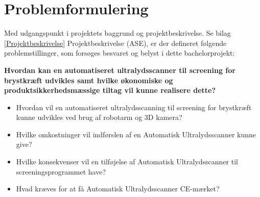 \section{Problemformulering}
Med udgangspunkt i projektets baggrund og projektbeskrivelse. Se bilag  \ref{Projektbeskrivelse} Projektbeskrivelse (ASE), er der defineret følgende problemstillinger, som forsøges besvaret og belyst i dette bachelorprojekt:

\textbf{Hvordan kan en automatiseret ultralydsscanner til screening for brystkræft udvikles samt hvilke økonomiske og produktsikkerhedsmæssige tiltag vil kunne realisere dette?}

\let\labelitemi\labelitemii
\begin{itemize}
\item Hvordan vil en automatiseret ultralydsscanning til screening for brystkræft kunne udvikles ved brug af robotarm og 3D kamera?
\item Hvilke omkostninger vil indførslen af en Automatisk Ultralydsscanner kunne give? 
\item Hvilke konsekvenser vil en tilføjelse af Automatisk Ultralydsscanner til screeningsprogrammet have?
\item Hvad kræves for at få Automatisk Ultralydsscanner CE-mærket? 
\end{itemize}
